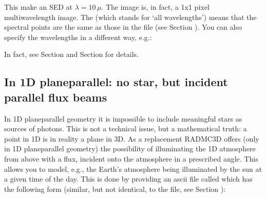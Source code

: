 \documentclass[letterpaper,10pt,english]{sphinxmanual}
\begin{document}
\begin{sphinxVerbatim}[commandchars=\\\{\}]
    
\end{sphinxVerbatim}

This make an SED at \(\lambda=10\,\mu\). The image is, in fact, a 1x1 pixel
multi\sphinxhyphen{}wavelength image. The  (which stands for ‘all wavelengths’) means
that the spectral points are the same as those in the 
file (see Section {\hyperref[\detokenize{inputoutputfiles:sec-wavelengths}]{}}).  You can also specify the wavelengths
in a different way, e.g.:

\begin{sphinxVerbatim}[commandchars=\\\{\}]
      
\end{sphinxVerbatim}

In fact, see Section {\hyperref[\detokenize{imagesspectra:sec-multi-wavelength-images}]{}} and
Section {\hyperref[\detokenize{imagesspectra:sec-set-camera-frequencies}]{}} for details.


\subsection{In 1\sphinxhyphen{}D plane\sphinxhyphen{}parallel: no star, but incident parallel flux beams}
\label{\detokenize{gridding:in-1-d-plane-parallel-no-star-but-incident-parallel-flux-beams}}
In 1\sphinxhyphen{}D plane\sphinxhyphen{}parallel geometry it is impossible to include meaningful stars as
sources of photons. This is not a technical issue, but a mathematical truth: a
point in 1\sphinxhyphen{}D is in reality a plane in 3\sphinxhyphen{}D. As a replacement RADMC\sphinxhyphen{}3D offers
(only in 1\sphinxhyphen{}D plane\sphinxhyphen{}parallel geometry) the possibility of illuminating the 1\sphinxhyphen{}D
atmosphere from above with a flux, incident onto the atmosphere in a prescribed
angle. This allows you to model, e.g., the Earth’s atmosphere being illuminated
by the sun at a given time of the day.  This is done by providing an ascii file
called  which has the following form (similar, but not identical,
to the  file, see Section {\hyperref[\detokenize{inputoutputfiles:sec-stars}]{}}):
\end{document}
